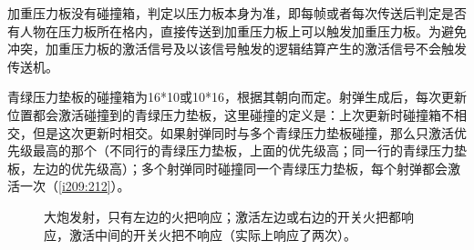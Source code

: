 加重压力板没有碰撞箱，判定以压力板本身为准，即每帧或者每次传送后判定是否有人物在压力板所在格内，直接传送到加重压力板上可以触发加重压力板。为避免冲突，加重压力板的激活信号及以该信号触发的逻辑结算产生的激活信号不会触发传送机。

青绿压力垫板的碰撞箱为16*10或10*16，根据其朝向而定。射弹生成后，每次更新位置都会激活碰撞到的青绿压力垫板，这里碰撞的定义是：上次更新时碰撞箱不相交，但是这次更新时相交。如果射弹同时与多个青绿压力垫板碰撞，那么只激活优先级最高的那个（不同行的青绿压力垫板，上面的优先级高；同一行的青绿压力垫板，左边的优先级高）；多个射弹同时碰撞同一个青绿压力垫板，每个射弹都会激活一次（\autoref{i209:212}）。

\begin{figure}[!h]
\begin{center}
\qquad
{}
\end{center}
\caption{\protect{}大炮发射，只有左边的火把响应；\protect{}激活左边或右边的开关火把都响应，激活中间的开关火把不响应（实际上响应了两次）。}
\label{i209:212}
\end{figure}

